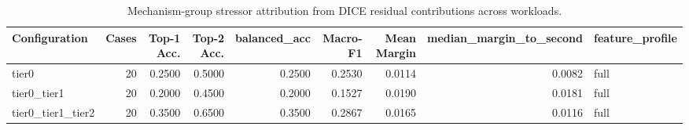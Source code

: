 \begin{table}[t]
\centering
\caption{Mechanism-group stressor attribution from DICE residual contributions across workloads.}
\label{tab:dice_stressor_diagnosis}
\footnotesize
\begin{tabular}{lrrrrrrrl}
\toprule
Configuration & Cases & Top-1 Acc. & Top-2 Acc. & balanced_acc & Macro-F1 & Mean Margin & median_margin_to_second & feature_profile \\
\midrule
tier0 & 20 & 0.2500 & 0.5000 & 0.2500 & 0.2530 & 0.0114 & 0.0082 & full \\
tier0_tier1 & 20 & 0.2000 & 0.4500 & 0.2000 & 0.1527 & 0.0190 & 0.0181 & full \\
tier0_tier1_tier2 & 20 & 0.3500 & 0.6500 & 0.3500 & 0.2867 & 0.0165 & 0.0116 & full \\
\bottomrule
\end{tabular}

\end{table}

